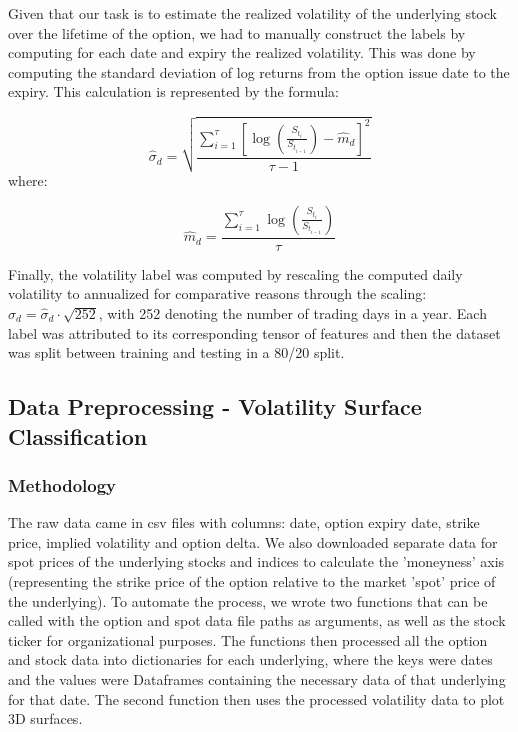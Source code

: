 \documentclass[10pt]{article}
\begin{document}
Given that our task is to estimate the realized volatility of the underlying stock over the lifetime of the option, we had to manually construct the labels by computing for each date and expiry the realized volatility\cite{andersen2003modeling}. This was done by computing the standard deviation of log returns from the option issue date to the expiry. This calculation is represented by the formula:

\begin{equation}
    \hat{\sigma}_d = \sqrt{\frac{\sum_{i = 1}^{\tau}[\log(\frac{S_{t_i}}{S_{t_{i-1}}}) - \hat{m}_d]^2}{\tau-1}}
\end{equation}
where:

\begin{equation}
    \hat{m}_d = \frac{\sum_{i=1}^{\tau} \log(\frac{S_{t_i}}{S_{t_{i-1}}})}{\tau}
\end{equation}

Finally, the volatility label was computed by rescaling the computed daily volatility to annualized for comparative reasons through the scaling: \(\sigma_d = \hat{\sigma}_d\cdot\sqrt{252}\), with 252 denoting the number of trading days in a year. Each label was attributed to its corresponding tensor of features and then the dataset was split between training and testing in a 80/20 split. 

\subsection{Data Preprocessing - Volatility Surface Classification}

\subsubsection{Methodology}

The raw data came in csv files with columns: date, option expiry date, strike price, implied volatility and option delta. We also downloaded separate data for spot prices of the underlying stocks and indices to calculate the 'moneyness' axis (representing the strike price of the option relative to the market 'spot' price of the underlying). To automate the process, we wrote two functions that can be called with the option and spot data file paths as arguments, as well as the stock ticker for organizational purposes. The functions then processed all the option and stock data into dictionaries for each underlying, where the keys were dates and the values were Dataframes containing the necessary data of that underlying for that date. The second function then uses the processed volatility data to plot 3D surfaces.
\end{document}
